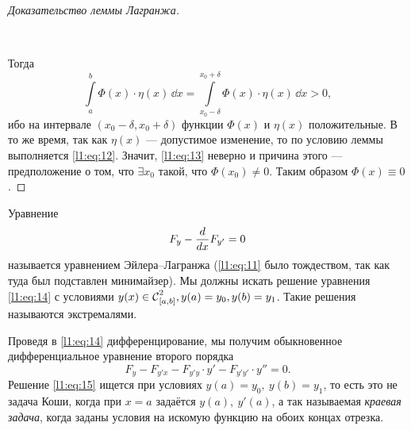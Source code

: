 \begin{proof}[Доказательство леммы Лагранжа]
\begin{figure}[H]
\begin{tikzpicture}[x=0.75pt,y=0.75pt,yscale=-1,xscale=1]
		
	\end{tikzpicture}
	\caption{~}
	\label{l1:fig:6}
\end{figure}
Тогда
	\begin{equation}
		\label{l1:eq:13}
		\int\limits_a^b \Phi(x)\cdot\eta(x)\,\dd{x}=\int\limits_{x_0-\delta}^{x_0+\delta} \Phi(x)\cdot\eta(x)\,\dd{x}>0,
	\end{equation}
	ибо на интервале $(x_0-\delta,x_0+\delta)$ функции $\Phi(x)$ и $\eta(x)$ положительные. В то же время, так как $\eta(x)$ --- допустимое изменение, то по условию леммы выполняется \eqref{l1:eq:12}. Значит, \eqref{l1:eq:13} неверно и причина этого --- предположение о том, что $\exists x_0$ такой, что $\Phi(x_0)\neq0$. Таким образом $\Phi(x)\equiv0$.
\end{proof}

Уравнение
\begin{equation}
	\label{l1:eq:14}
	 F_y-\der{}{x}F_{y'}=0
\end{equation} 
называется уравнением Эйлера--Лагранжа (\eqref{l1:eq:11} было тождеством, так как туда был подставлен минимайзер). Мы должны искать решение уравнения \eqref{l1:eq:14} с условиями $y(x)\in\Cfn[{[a,b]}]{2}, y(a)=y_0, y(b)=y_1$. Такие решения называются экстремалями.

Проведя в \eqref{l1:eq:14} дифференцирование, мы получим обыкновенное дифференциальное уравнение второго порядка 
\begin{equation}
	\label{l1:eq:15}
	 F_y-F_{y'x}-F_{y'y}\cdot y'-F_{y'y'}\cdot y''=0.
\end{equation}
Решение \eqref{l1:eq:15} ищется при условиях $y(a)=y_0,\ y(b)=y_1$, то есть это не задача Коши, когда при $x=a$ задаётся $y(a),\ y'(a)$, а так называемая \emph{краевая задача}, когда заданы условия на искомую функцию на обоих концах отрезка.
\vspace{0.2cm}

